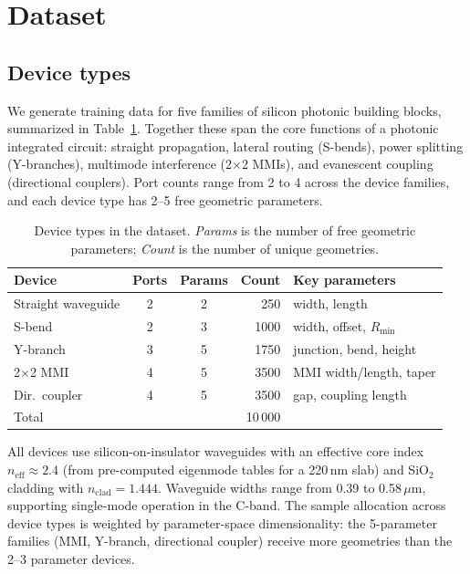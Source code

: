 \section{\label{sec:dataset}Dataset}

\subsection{Device types}

We generate training data for five families of silicon photonic building blocks, summarized in
Table~\ref{tab:devices}. Together these span the core functions of a photonic integrated circuit: straight propagation,
lateral routing (S-bends), power splitting (Y-branches), multimode interference (2$\times$2 MMIs), and evanescent
coupling (directional couplers). Port counts range from 2 to 4 across the device families, and each device type has
2--5 free geometric parameters.

\begin{table}[t]
\centering
\caption{Device types in the dataset. \emph{Params} is the number of free geometric parameters; \emph{Count} is the
number of unique geometries.}
\label{tab:devices}
\begin{tabular}{lccrl}
\hline\hline
Device & Ports & Params & Count & Key parameters \\
\hline
Straight waveguide & 2 & 2 & 250  & width, length \\
S-bend             & 2 & 3 & 1000 & width, offset, $R_\text{min}$ \\
Y-branch           & 3 & 5 & 1750 & junction, bend, height \\
2$\times$2 MMI     & 4 & 5 & 3500 & MMI width/length, taper \\
Dir.\ coupler      & 4 & 5 & 3500 & gap, coupling length \\
\hline
Total              &   &   & 10\,000 & \\
\hline\hline
\end{tabular}
\end{table}

All devices use silicon-on-insulator waveguides with an effective core index $n_\text{eff} \approx 2.4$ (from
pre-computed eigenmode tables for a 220\,nm slab) and SiO$_2$ cladding with $n_\text{clad} = 1.444$. Waveguide widths
range from 0.39 to 0.58\,$\mu$m, supporting single-mode operation in the C-band. The sample allocation across device
types is weighted by parameter-space dimensionality: the 5-parameter families (MMI, Y-branch, directional coupler)
receive more geometries than the 2--3 parameter devices.

